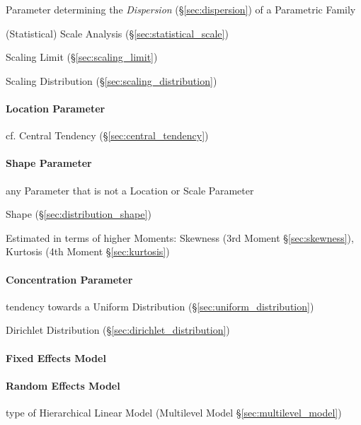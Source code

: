 Parameter determining the \emph{Dispersion} (\S\ref{sec:dispersion}) of a
Parametric Family

\fist (Statistical) Scale Analysis (\S\ref{sec:statistical_scale})

\fist Scaling Limit (\S\ref{sec:scaling_limit})

\fist Scaling Distribution (\S\ref{sec:scaling_distribution})



\paragraph{Location Parameter}\label{sec:location_parameter}\hfill

cf. Central Tendency (\S\ref{sec:central_tendency})



\paragraph{Shape Parameter}\label{sec:shape_parameter}\hfill

any Parameter that is not a Location or Scale Parameter

\fist Shape (\S\ref{sec:distribution_shape})

Estimated in terms of higher Moments: Skewness (3rd Moment
\S\ref{sec:skewness}), Kurtosis (4th Moment \S\ref{sec:kurtosis})



\paragraph{Concentration Parameter}\label{sec:concentration_parameter}\hfill

tendency towards a Uniform Distribution (\S\ref{sec:uniform_distribution})

Dirichlet Distribution (\S\ref{sec:dirichlet_distribution})



\paragraph{Fixed Effects Model}\label{sec:fixed_effect}\hfill

\paragraph{Random Effects Model}\label{sec:random_effect}\hfill

type of Hierarchical Linear Model (Multilevel Model
\S\ref{sec:multilevel_model})

